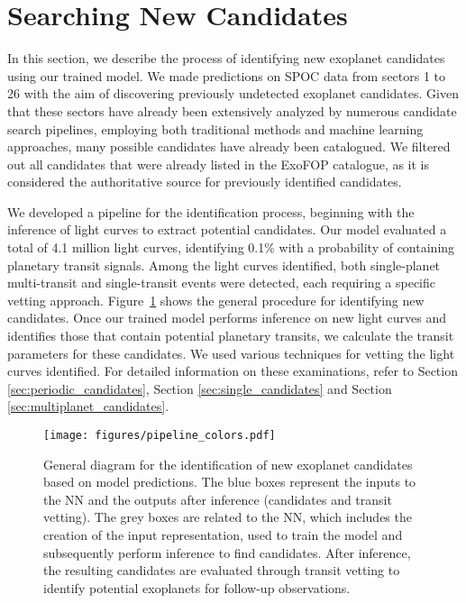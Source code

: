 \section{Searching New Candidates}
\label{sec:search_candidates}
In this section, we describe the process of identifying new exoplanet candidates using our trained model. We made predictions on SPOC data from sectors 1 to 26 with the aim of discovering previously undetected exoplanet candidates. Given that these sectors have already been extensively analyzed by numerous candidate search pipelines, employing both traditional methods and machine learning approaches, many possible candidates have already been catalogued. We filtered out all candidates that were already listed in the ExoFOP catalogue, as it is considered the authoritative source for previously identified candidates.
\par

We developed a pipeline for the identification process, beginning with the inference of light curves to extract potential candidates. Our model evaluated a total of 4.1 million light curves, identifying 0.1\% with a probability of containing planetary transit signals. Among the light curves identified, both single-planet multi-transit and single-transit events were detected, each requiring a specific vetting approach. Figure~\ref{fig:pipeline} shows the general procedure for identifying new candidates. Once our trained model performs inference on new light curves and identifies those that contain potential planetary transits, we calculate the transit parameters for these candidates. We used various techniques for vetting the light curves identified. For detailed information on these examinations, refer to Section \ref{sec:periodic_candidates}, Section \ref{sec:single_candidates} and Section \ref{sec:multiplanet_candidates}. \par


\begin{figure}
\begin{center}
\vspace{5mm}
\texttt{[image: figures/pipeline\_colors.pdf]}
\vspace{-2mm} 
\caption{\label{fig:pipeline}
General diagram for the identification of new exoplanet candidates based on model predictions. The blue boxes represent the inputs to the NN and the outputs after inference (candidates and transit vetting). The grey boxes are related to the NN, which includes the creation of the input representation, used to train the model and subsequently perform inference to find candidates. After inference, the resulting candidates are evaluated through transit vetting to identify potential exoplanets for follow-up observations.}
\vspace{-1mm}
\end{center}
\end{figure}


